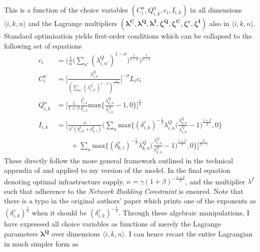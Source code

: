 \documentclass[11pt, oneside]{article}   	%
\begin{document}
This is a function of the choice variables $(C_{i}^{n}, Q_{i,k}^{n}, c_{i}, I_{i,k})$ in all dimensions $\langle i,k,n \rangle$ and the Lagrange multipliers $(\bm{\lambda^{C}}, \bm{\lambda^{Q}}, \bm{\lambda^{I}}, \bm{\zeta^{Q}}, \bm{\zeta^{C}}, \bm{\zeta^{c}}, \bm{\zeta^{I}})$ also in $\langle i,k,n \rangle$. Standard optimisation yields first-order conditions which can be collapsed to the following set of equations
\begin{equation}
    \label{eq:foc}
  \begin{aligned}
    c_{i} & = \bigg( \frac{1}{\alpha} \Big( \sum_{n'}^{} (\lambda^{Q}_{i,n'})^{1-\sigma}\Big)^{\frac{1}{1-\sigma}}\bigg)^{\frac{1}{\alpha-1}} \\
    C_{i}^{n} & = \Bigg[ \frac{\lambda^{Q}_{i,n}}{(\sum_{n'}^{} (\lambda^{Q}_{i,n'})^{1-\sigma})^{\frac{1}{1-\sigma}}} \Bigg]^{-\sigma}L_{i}c_{i} \\
    Q_{i,k}^{n} & = \Bigg[\frac{1}{1+\beta} \frac{I_{i,k}^{\gamma}}{\delta_{i,k}^{\tau}} \textrm{max}\Big\{\frac{\lambda^{Q}_{k,n}}{\lambda^{Q}_{i,n}}-1,0\Big\}\Bigg]^{\frac{1}{\beta}} \\
    I_{i,k} & = \Bigg[ \frac{\kappa}{\lambda^{I}(\delta^{I}_{i,k} + \delta^{I}_{k,i})} \bigg( \sum_{n}^{} \textrm{max}\Big\{ (\delta^{\tau}_{i,k})^{-\frac{1}{\beta}} \lambda^{Q}_{i,n} \Big( \frac{\lambda^{Q}_{k,n}}{\lambda^{Q}_{i,n}}-1 \Big)^{\frac{1+\beta}{\beta}} , 0\Big\} \\
    & \qquad + \sum_{n}^{} \textrm{max}\Big\{ (\delta^{\tau}_{k,i})^{-\frac{1}{\beta}} \lambda^{Q}_{k,n} \Big( \frac{\lambda^{Q}_{i,n}}{\lambda^{Q}_{k,n}}-1 \Big)^{\frac{1+\beta}{\beta}} , 0\Big\} \Bigg]^{\frac{\beta}{\beta-\gamma}}
  \end{aligned}
\end{equation}
These directly follow the more general framework outlined in the technical appendix of \citeauthor{fajgelbaum_optimal_2017} and applied to my version of the model. In the final equation denoting optimal infrastructure supply, $\kappa = \gamma(1+\beta)^{-\frac{1+\beta}{\beta}}$, and the multiplier $\lambda^{I}$ such that adherence to the \emph{Network Building Constraint} is ensured. Note that there is a typo in the original authors' paper which prints one of the exponents as $(\delta^{\tau}_{i,k})^{\frac{1}{\beta}}$ when it should be $(\delta^{\tau}_{i,k})^{-\frac{1}{\beta}}$. Through these algebraic manipulations, I have expressed all choice variables as functions of merely the Lagrange parameters $\bm{\lambda^{Q}}$ over dimensions $\langle i,k,n \rangle$. I can hence recast the entire Lagrangian in much simpler form as
\end{document}
